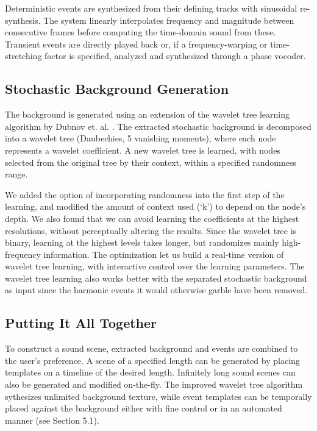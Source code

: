 \documentclass[a4paper]{article}
\begin{document}
Deterministic events are synthesized from their defining tracks with 
sinusoidal re-synthesis. The system linearly interpolates frequency and magnitude 
between consecutive frames before computing the time-domain sound from 
these. Transient events are directly played back or, if a frequency-warping or time-stretching 
factor is specified, analyzed and synthesized through a phase vocoder.

\subsection{Stochastic Background Generation}

The background is generated using an extension of the wavelet tree learning 
algorithm by Dubnov et. al. \cite{Dubnov02}. The extracted 
stochastic background is decomposed into a wavelet tree (Daubechies, 5 vanishing moments),  
where each node represents a wavelet coefficient. 
A new wavelet tree is learned, with nodes selected from the original tree 
by their context, within a specified randomness range.

We added the option of incorporating randomness into the first step of the 
learning, and modified the amount of context used (`k') to depend on 
the node's depth. We also found 
that we can avoid learning the coefficients at the highest resolutions, 
without perceptually altering the results. Since the wavelet tree is binary, learning 
at the highest levels takes longer, but randomizes mainly high-frequency information. 
The optimization let us build a real-time version of wavelet tree learning, 
with interactive control over the learning parameters. The wavelet tree learning also works 
better with the separated stochastic background as input since the harmonic events 
it would otherwise garble have been removed. 

\subsection{Putting It All Together}

To construct a sound scene, extracted background and events are combined 
to the user's preference. A scene of a specified length 
can be generated by placing templates on a timeline of the desired length. 
Infinitely long sound scenes can also be generated and modified on-the-fly. 
The improved wavelet tree algorithm sythesizes unlimited background texture, while 
event templates can be temporally placed against the background either with fine 
control or in an automated manner (see Section 5.1). 
\end{document}
